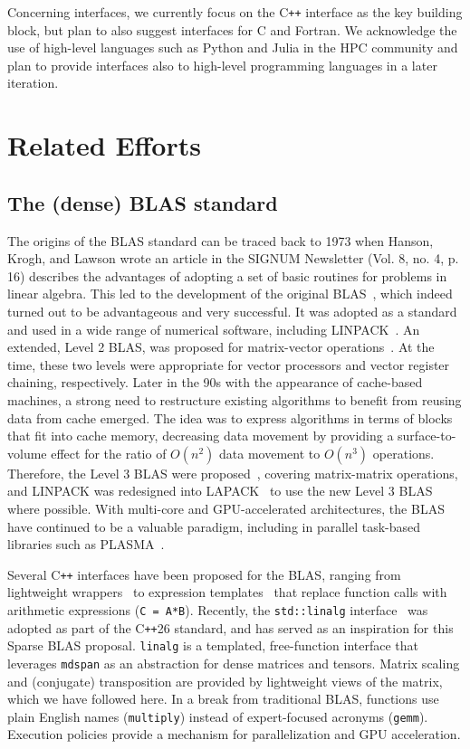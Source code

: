 \documentclass{article}
\newcommand{\cplusplus}{C\texttt{++}\xspace}
\newcommand{\cppstd}[1]{C\texttt{++}#1\xspace}
\begin{document}
Concerning interfaces, we currently focus on the \cplusplus interface as the key building block, but plan to also suggest interfaces for C and Fortran.  We acknowledge the use of high-level languages such as Python and Julia in the HPC community and plan to provide interfaces also to high-level programming languages in a later iteration.

\section{Related Efforts}

\subsection{The (dense) BLAS standard}
The origins of the BLAS standard can be
traced back to 1973 when Hanson, Krogh, and Lawson wrote an article in the
SIGNUM Newsletter (Vol. 8, no. 4, p. 16) describes the advantages of adopting
a set of basic routines for problems in linear algebra. This led to the
development of the original BLAS~\cite{Lawson1979l1blas}, which indeed turned out to be
advantageous and very successful. It was adopted as a standard and used in a
wide range of numerical software, including LINPACK~\cite{Dongara:1979:linpack}. An extended, Level 2 BLAS, was proposed for matrix-vector operations~\cite{dongarra1988a,dongarra1988b}.
At the time, these two levels were appropriate for vector processors and
vector register chaining, respectively.
Later in the 90s with the appearance of cache-based machines, a strong need to restructure existing algorithms to benefit from reusing data from cache emerged.
The idea was to express algorithms in terms of blocks that fit into cache memory,
decreasing data movement by providing a surface-to-volume effect for
the ratio of $O(n^2)$ data movement to $O(n^3)$ operations.
Therefore, the Level 3 BLAS were proposed~\cite{dongarra1990a,dongarra1990b},
covering matrix-matrix operations, and LINPACK was redesigned
into LAPACK~\cite{anderson1999} to use the new Level 3 BLAS where possible.
With multi-core and GPU-accelerated architectures, the BLAS have continued to
be a valuable paradigm, including in parallel task-based libraries such
as PLASMA~\cite{agullo2009numerical}.

Several \cplusplus interfaces have been proposed for the BLAS,
ranging from lightweight wrappers~\cite{gates2017cpp} to
expression templates~\cite{siek1998matrix,boost_ublas,eigen} that replace
function calls with arithmetic expressions (\verb+C = A*B+).
Recently, the \verb+std::linalg+ interface~\cite{hoemmen2023linalg}
was adopted as part of the
\cppstd{26} standard, and has served as an inspiration
for this Sparse BLAS proposal.
\texttt{linalg} is a templated, free-function interface that leverages
\texttt{mdspan} as an
abstraction for dense matrices and tensors.
Matrix scaling and (conjugate) transposition are provided by lightweight
views of the matrix, which we have followed here.
In a break from traditional
BLAS, functions use plain English names (\verb+multiply+) instead
of expert-focused acronyms (\verb+gemm+). Execution policies provide
a mechanism for parallelization and GPU acceleration.
\end{document}
